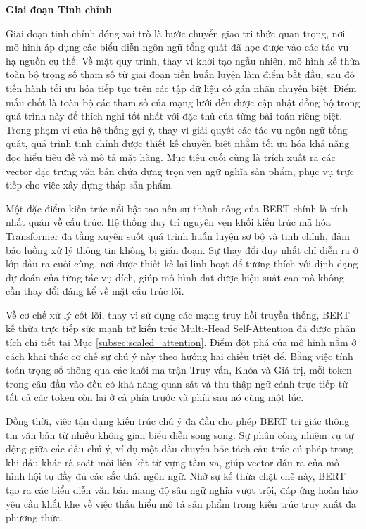 \noindent \textbf{Giai đoạn Tinh chỉnh}

Giai đoạn tinh chỉnh đóng vai trò là bước chuyển giao tri thức quan trọng, nơi mô hình áp dụng các biểu diễn ngôn ngữ tổng quát đã học được vào các tác vụ hạ nguồn cụ thể. Về mặt quy trình, thay vì khởi tạo ngẫu nhiên, mô hình kế thừa toàn bộ trọng số tham số từ giai đoạn tiền huấn luyện làm điểm bắt đầu, sau đó tiến hành tối ưu hóa tiếp tục trên các tập dữ liệu có gán nhãn chuyên biệt. Điểm mấu chốt là toàn bộ các tham số của mạng lưới đều được cập nhật đồng bộ trong quá trình này để thích nghi tốt nhất với đặc thù của từng bài toán riêng biệt. Trong phạm vi của hệ thống gợi ý, thay vì giải quyết các tác vụ ngôn ngữ tổng quát, quá trình tinh chỉnh được thiết kế chuyên biệt nhằm tối ưu hóa khả năng đọc hiểu tiêu đề và mô tả mặt hàng. Mục tiêu cuối cùng là trích xuất ra các vector đặc trưng văn bản chứa đựng trọn vẹn ngữ nghĩa sản phẩm, phục vụ trực tiếp cho việc xây dựng tháp sản phẩm.

Một đặc điểm kiến trúc nổi bật tạo nên sự thành công của BERT chính là tính nhất quán về cấu trúc. Hệ thống duy trì nguyên vẹn khối kiến trúc mã hóa Transformer đa tầng xuyên suốt quá trình huấn luyện sơ bộ và tinh chỉnh, đảm bảo luồng xử lý thông tin không bị gián đoạn. Sự thay đổi duy nhất chỉ diễn ra ở lớp đầu ra cuối cùng, nơi được thiết kế lại linh hoạt để tương thích với định dạng dự đoán của từng tác vụ đích, giúp mô hình đạt được hiệu suất cao mà không cần thay đổi đáng kể về mặt cấu trúc lõi.

Về cơ chế xử lý cốt lõi, thay vì sử dụng các mạng truy hồi truyền thống, BERT kế thừa trực tiếp sức mạnh từ kiến trúc Multi-Head Self-Attention đã được phân tích chi tiết tại Mục \ref{subsec:scaled_attention}. Điểm đột phá của mô hình nằm ở cách khai thác cơ chế sự chú ý này theo hướng hai chiều triệt để. Bằng việc tính toán trọng số thông qua các khối ma trận Truy vấn, Khóa và Giá trị, mỗi token trong câu đầu vào đều có khả năng quan sát và thu thập ngữ cảnh trực tiếp từ tất cả các token còn lại ở cả phía trước và phía sau nó cùng một lúc. 

Đồng thời, việc tận dụng kiến trúc chú ý đa đầu cho phép BERT tri giác thông tin văn bản từ nhiều không gian biểu diễn song song. Sự phân công nhiệm vụ tự động giữa các đầu chú ý, ví dụ một đầu chuyên bóc tách cấu trúc cú pháp trong khi đầu khác rà soát mối liên kết từ vựng tầm xa, giúp vector đầu ra của mô hình hội tụ đầy đủ các sắc thái ngôn ngữ. Nhờ sự kế thừa chặt chẽ này, BERT tạo ra các biểu diễn văn bản mang độ sâu ngữ nghĩa vượt trội, đáp ứng hoàn hảo yêu cầu khắt khe về việc thấu hiểu mô tả sản phẩm trong kiến trúc truy xuất đa phương thức.

